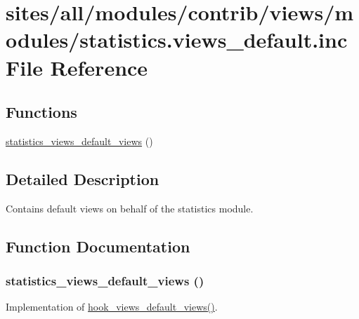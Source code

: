 \hypertarget{statistics_8views__default_8inc}{
\section{sites/all/modules/contrib/views/modules/statistics.views\_\-default.inc File Reference}
\label{statistics_8views__default_8inc}
}
\subsection*{Functions}
\begin{CompactItemize}
\item 
\hyperlink{statistics_8views__default_8inc_2560285ba5736526a07b94a2aa0e4621}{statistics\_\-views\_\-default\_\-views} ()
\end{CompactItemize}


\subsection{Detailed Description}
Contains default views on behalf of the statistics module. 

\subsection{Function Documentation}
\hypertarget{statistics_8views__default_8inc_2560285ba5736526a07b94a2aa0e4621}{
\subsubsection[{statistics\_\-views\_\-default\_\-views}]{\setlength{\rightskip}{0pt plus 5cm}statistics\_\-views\_\-default\_\-views ()}}
\label{statistics_8views__default_8inc_2560285ba5736526a07b94a2aa0e4621}


Implementation of \hyperlink{group__views__hooks_g23edb74860682fa88f75cf94b97c2e15}{hook\_\-views\_\-default\_\-views()}. 